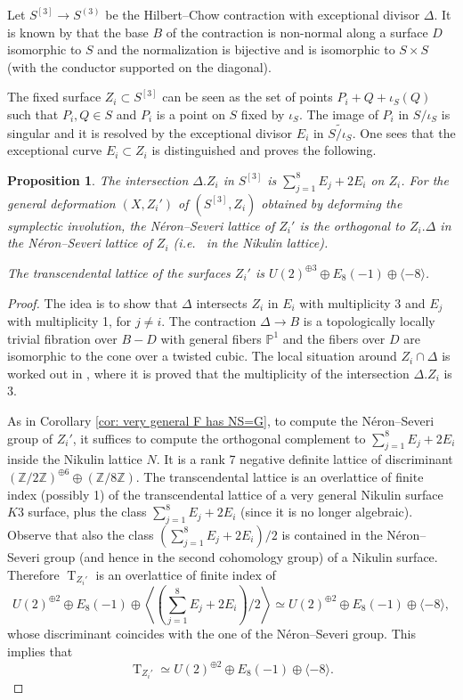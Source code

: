 \documentclass{amsart}
\newtheorem{prop}[thm]{Proposition}
\theoremstyle{definition}
\numberwithin{equation}{section}
\numberwithin{equation}{section} \theoremstyle{definition}
\DeclareMathOperator{\T}{T}
\newcommand\PP{{\mathbb{P}}}
\newcommand\Z{\mathbb{Z}}
\begin{document}
Let $S^{[3]}\to S^{(3)}$ be the Hilbert--Chow contraction with exceptional divisor $\Delta$. It is known by \cite{G} that the base $B$ of the contraction is non-normal along a surface $D$ isomorphic to $S$ and the normalization is bijective and is isomorphic to $S\times S $ (with the conductor supported on the diagonal).

The fixed surface $Z_i\subset S^{[3]}$ can be seen as the set of points $P_i+Q+\iota_S(Q)$ such that $P_i,Q\in S $ and $P_i$ is a point on $S$ fixed by $\iota_S$. The image of $P_i$ in $S/\iota_S$ is singular and it is resolved by the exceptional divisor $E_i$ in $\widetilde{S/\iota_S}$. 
One sees that the exceptional curve $E_i\subset Z_i$ is distinguished and proves the following.
    
\begin{prop}\label{prop: fixed locus 6 dimnesion}
   The intersection  $\Delta.Z_i$ in $S^{[3]}$ is $\sum_{j=1}^8E_j+2E_i$ on $Z_i$.
   For the general deformation $(X,Z_i')$ of $(S^{[3]},Z_i)$ obtained by deforming the symplectic involution, the N\'eron--Severi lattice of
   $Z_i'$ is the orthogonal to $Z_i.\Delta$ in the N\'eron--Severi lattice of $Z_i$ (i.e.~ in the Nikulin lattice).

The transcendental lattice of the surfaces $Z_i'$ is $U(2)^{\oplus 3}\oplus E_8(-1)\oplus \langle -8\rangle$.
\end{prop}

\begin{proof}
The idea is to show that $\Delta$ intersects $Z_i$ in $E_i$ with multiplicity $3$ and $E_j$ with multiplicity 1, for $j\neq i$.
The contraction $\Delta \to B$ is a topologically locally trivial fibration over $B-D$ with general fibers $\PP^1$ and the fibers over $D$ are isomorphic to the cone over a twisted cubic.
The local situation around $Z_i\cap \Delta$ is worked out in \cite[page 13 diagram 8]{F}, where it is proved that 
the multiplicity of the intersection $\Delta .Z_i$ is $3$.

As in Corollary \ref{cor: very general F has NS=G}, to compute the N\'eron--Severi group of $Z_i'$, it suffices to compute the orthogonal complement to $\sum_{j=1}^8E_j+2E_i$ inside the Nikulin lattice $N$. It is a rank 7 negative definite lattice of discriminant $(\Z/2\Z)^{\oplus 6}\oplus (\Z/8\Z)$. The transcendental lattice is an overlattice of finite index (possibly 1) of the transcendental lattice of a very general Nikulin surface $K3$ surface, plus the class $\sum_{j=1}^8E_j+2E_i$ (since it is no longer algebraic). Observe that also the class $(\sum_{j=1}^8E_j+2E_i)/2$ is contained in the N\'eron--Severi group (and hence in the second cohomology group) of a Nikulin surface. Therefore $\T_{Z_i'}$ is an overlattice of finite index of $$U(2)^{\oplus 2}\oplus E_8(-1)\oplus  \left\langle \left(\sum_{j=1}^8E_j+2E_i\right)/2\right\rangle\simeq U(2)^{\oplus 2}\oplus E_8(-1)\oplus  \langle -8\rangle,$$ whose discriminant coincides with the one of the N\'eron--Severi group. This implies that $$\T_{Z_i'}\simeq U(2)^{\oplus 2}\oplus E_8(-1)\oplus  \langle -8\rangle.$$ 
\end{proof}
\end{document}
